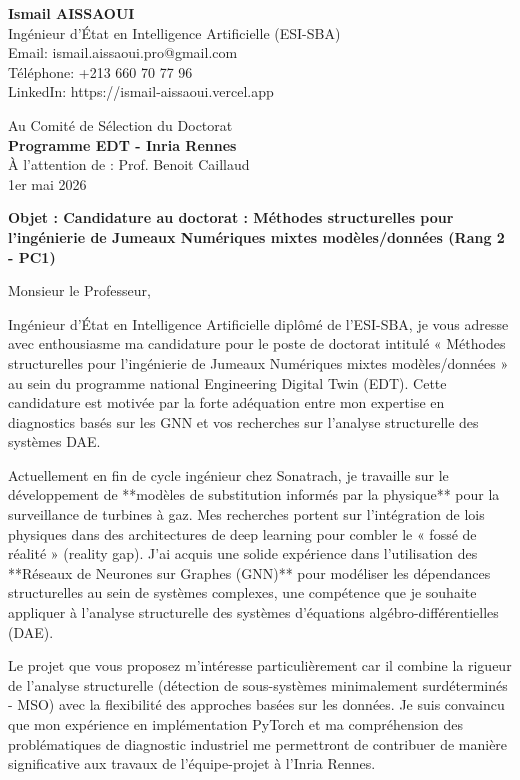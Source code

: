 \documentclass[11pt,a4paper]{article}
\begin{document}
\noindent \textbf{Ismail AISSAOUI} \\
Ingénieur d'État en Intelligence Artificielle (ESI-SBA) \\
Email: ismail.aissaoui.pro@gmail.com \\
Téléphone: +213 660 70 77 96 \\
LinkedIn: https://ismail-aissaoui.vercel.app

\bigskip

\begin{flushright}
    Au Comité de Sélection du Doctorat \\
    \textbf{Programme EDT - Inria Rennes} \\
    À l'attention de : Prof. Benoit Caillaud \\
    \medskip
    1er mai 2026
\end{flushright}

\bigskip

\noindent \textbf{Objet : Candidature au doctorat : Méthodes structurelles pour l'ingénierie de Jumeaux Numériques mixtes modèles/données (Rang 2 - PC1)}

\bigskip

Monsieur le Professeur,

Ingénieur d'État en Intelligence Artificielle diplômé de l'ESI-SBA, je vous adresse avec enthousiasme ma candidature pour le poste de doctorat intitulé « Méthodes structurelles pour l'ingénierie de Jumeaux Numériques mixtes modèles/données » au sein du programme national Engineering Digital Twin (EDT). Cette candidature est motivée par la forte adéquation entre mon expertise en diagnostics basés sur les GNN et vos recherches sur l'analyse structurelle des systèmes DAE.

Actuellement en fin de cycle ingénieur chez Sonatrach, je travaille sur le développement de **modèles de substitution informés par la physique** pour la surveillance de turbines à gaz. Mes recherches portent sur l'intégration de lois physiques dans des architectures de deep learning pour combler le « fossé de réalité » (reality gap). J'ai acquis une solide expérience dans l'utilisation des **Réseaux de Neurones sur Graphes (GNN)** pour modéliser les dépendances structurelles au sein de systèmes complexes, une compétence que je souhaite appliquer à l'analyse structurelle des systèmes d'équations algébro-différentielles (DAE).

Le projet que vous proposez m'intéresse particulièrement car il combine la rigueur de l'analyse structurelle (détection de sous-systèmes minimalement surdéterminés - MSO) avec la flexibilité des approches basées sur les données. Je suis convaincu que mon expérience en implémentation PyTorch et ma compréhension des problématiques de diagnostic industriel me permettront de contribuer de manière significative aux travaux de l'équipe-projet à l'Inria Rennes.
\end{document}

